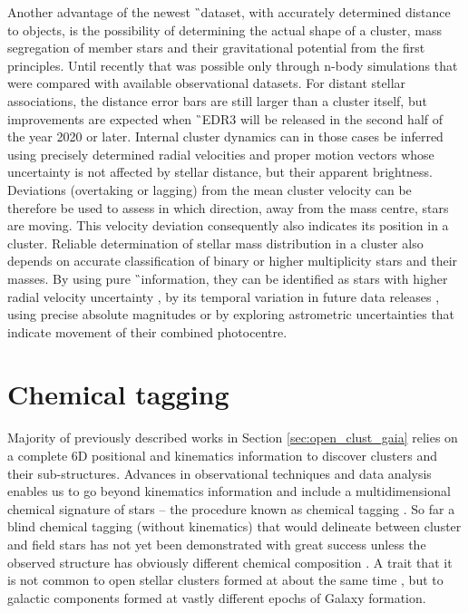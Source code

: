Another advantage of the newest \G\ dataset, with accurately determined distance to objects, is the possibility of determining the actual shape of a cluster, mass segregation of member stars and their gravitational potential from the first principles. Until recently that was possible only through n-body simulations \cite{1987MNRAS.224..193T, 2016MNRAS.456.3757S, 2018MNRAS.473..849D} that were compared with available observational datasets. For distant stellar associations, the distance error bars are still larger than a cluster itself, but improvements are expected when \G\ EDR3 will be released in the second half of the year 2020 or later. Internal cluster dynamics can in those cases be inferred using precisely determined radial velocities and proper motion vectors whose uncertainty is not affected by stellar distance, but their apparent brightness. Deviations (overtaking or lagging) from the mean cluster velocity can be therefore be used to assess in which direction, away from the mass centre, stars are moving. This velocity deviation consequently also indicates its position in a cluster. Reliable determination of stellar mass distribution in a cluster also depends on accurate classification of binary or higher multiplicity stars and their masses. By using pure \G\ information, they can be identified as stars with higher radial velocity uncertainty \cite{2018RNAAS...2b..20E}, by its temporal variation in future data releases \cite{2019AJ....158..155B}, using precise absolute magnitudes \cite{2018ApJ...857..114W, 2018A&A...616A..10G, 2019MNRAS.487.2474C} or by exploring astrometric uncertainties \cite{2020arXiv200305467B} that indicate movement of their combined photocentre. 

\section{Chemical tagging}
Majority of previously described works in Section \ref{sec:open_clust_gaia} relies on a complete 6D positional and kinematics information to discover clusters and their sub-structures. Advances in observational techniques and data analysis enables us to go beyond kinematics information and include a multidimensional chemical signature of stars -- the procedure known as chemical tagging \cite{2002ARA&A..40..487F, 2010ApJ...721..582B}. So far a blind chemical tagging (without kinematics) that would delineate between cluster and field stars has not yet been demonstrated with great success unless the observed structure has obviously different chemical composition \cite{2016ApJ...833..262H}. A trait that it is not common to open stellar clusters formed at about the same time \cite{2019A&A...629A..34G}, but to galactic components formed at vastly different epochs \cite{2018A&A...619A.125A} of Galaxy formation.

